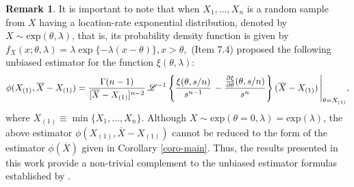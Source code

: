 \documentclass[12pt]{article}
\theoremstyle{definition}
\newtheorem{remark}[theorem]{Remark}
\begin{document}
	\begin{remark}
		It is important to note that {\color{black} when $X_1,\ldots,X_n$ is a random sample from $X$ having a location-rate exponential distribution, 
        denoted by $X\sim\text{exp}(\theta,\lambda)$, 
        that is, its probability density function is given by 
$
f_X(x;\theta,\lambda)=\lambda \exp\{-\lambda(x-\theta)\}, x>\theta,
$
\cite{Tate1959} (Item 7.4) proposed the following unbiased  estimator for the function $\xi(\theta,\lambda)$: 
\begin{align*}
	\phi(X_{(1)},\overline{X}-X_{(1)})
=
{\Gamma(n-1)\over [\overline{X}-X_{(1)}]^{n-2}} \, 
\mathscr{L}^{-1}\left\{
{\xi(\theta,s/n)\over s^{n-1}} \, 
-	{{\partial\xi\over\partial\theta}(\theta,s/n)\over s^{n}} 
\right\}(\overline{X}-X_{(1)}) \, 
\Bigg\vert_{\theta=X_{(1)}},
\end{align*}
where $X_{(1)}\equiv\min\{X_1,\ldots,X_n\}$.
%
Although $X\sim\text{exp}(\theta=0,\lambda)=\text{exp}(\lambda)$, the above estimator $\phi(X_{(1)},\overline{X}-X_{(1)})$ cannot be reduced to the form of the estimator $\phi(\overline{X})$ given in Corollary \ref{coro-main}. Thus, the results presented in this work provide a non-trivial complement to the unbiased estimator formulas established by \cite{Tate1959}.
%
}
\end{remark}
\end{document}
